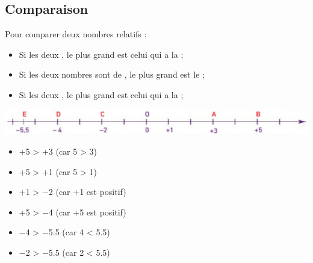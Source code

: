 \subsection{Comparaison}

\begin{myprops}
	Pour comparer deux nombres relatifs :
	\begin{itemize}
		\item Si les deux , le plus grand est celui qui a la ;
		\item Si les deux nombres sont de , le plus grand est le ;
		\item Si les deux , le plus grand est celui qui a la ;
	\end{itemize}
\end{myprops}


\begin{myexs}
	\begin{center}
		\includegraphics[scale=0.5]{img/droite2}		
	\end{center}


	\begin{multicols}{2}
		\begin{itemize}
			\item +5 > +3 (car 5 > 3)
			\item +5 > +1 (car 5 > 1)
			\item +1 > \num{-2} (car +1 est positif)
			\item +5 > \num{-4} (car +5 est positif)
			\item \num{-4} > \num{-5.5} (car 4 < \num{5.5})
			\item \num{-2} > \num{-5.5} (car 2 < \num{5.5})
		\end{itemize}
	\end{multicols}
\end{myexs}
